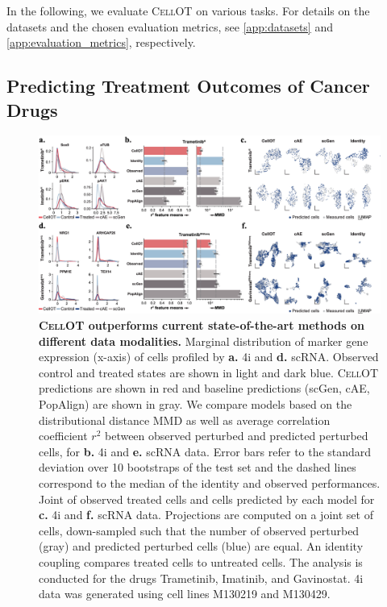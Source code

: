 In the following, we evaluate \textsc{CellOT} on various tasks. For details on the datasets and the chosen evaluation metrics, see \cref{app:datasets} and \cref{app:evaluation_metrics}, respectively.

\subsection{Predicting Treatment Outcomes of Cancer Drugs}

\begin{figure}[t]
    \centering
    \includegraphics[width=\textwidth]{figures/fig_benchmark_cellot.png}
    \caption{ \textbf{\textsc{CellOT} outperforms current state-of-the-art methods on different data modalities.}  Marginal distribution of marker gene expression (x-axis) of cells profiled by \textbf{a.} \acrshort{4i} and \textbf{d.} \acrshort{sc}\acrshort{RNA}. Observed control and treated states are shown in light and dark blue. \textsc{CellOT} predictions are shown in red and baseline predictions (scGen, cAE, PopAlign) are shown in gray. We compare models based on the distributional distance \acrshort{MMD} as well as average correlation coefficient $r^2$ between observed perturbed and predicted perturbed cells, for \textbf{b.} \acrshort{4i} and \textbf{e.} \acrshort{sc}\acrshort{RNA} data. Error bars refer to the standard deviation over 10 bootstraps of the test set and the dashed lines correspond to the median of the identity and observed performances. Joint  of observed treated cells and cells predicted by each model for \textbf{c.} \acrshort{4i} and \textbf{f.} \acrshort{sc}\acrshort{RNA} data. Projections are computed on a joint set of cells, down-sampled such that the number of observed perturbed (gray) and predicted perturbed cells (blue) are equal. An identity coupling compares treated cells to untreated cells. The analysis is conducted for the drugs Trametinib, Imatinib, and Gavinostat. \acrshort{4i} data was generated using cell lines M130219 and M130429.}
    \label{fig:benchmark_cellot}
\end{figure}

